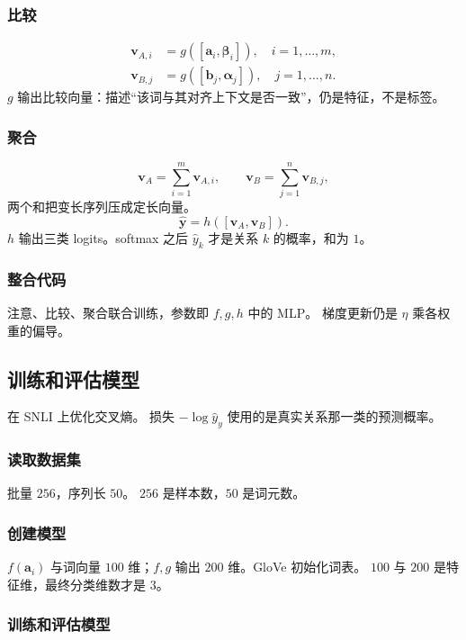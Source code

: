 \subsubsection{比较}

\begin{align*}
\bm{v}_{A,i}&=g([\bm{a}_i,\bm{\beta}_i]),\quad i=1,\ldots,m,
\\
\bm{v}_{B,j}&=g([\bm{b}_j,\bm{\alpha}_j]),\quad j=1,\ldots,n.
\end{align*}
$g$ 输出比较向量：描述“该词与其对齐上下文是否一致”，仍是特征，不是标签。

\subsubsection{聚合}

\[
\bm{v}_A=\sum_{i=1}^{m}\bm{v}_{A,i},\qquad
\bm{v}_B=\sum_{j=1}^{n}\bm{v}_{B,j},
\]
两个和把变长序列压成定长向量。
\[
\hat{\bm{y}}=h([\bm{v}_A,\bm{v}_B]).
\]
$h$ 输出三类 logits。softmax 之后 $\hat y_k$ 才是关系 $k$ 的概率，和为 $1$。

\subsubsection{整合代码}

注意、比较、聚合联合训练，参数即 $f,g,h$ 中的 MLP。
梯度更新仍是 $\eta$ 乘各权重的偏导。

\subsection{训练和评估模型}

在 SNLI 上优化交叉熵。
损失 $-\log\hat y_y$ 使用的是真实关系那一类的预测概率。

\subsubsection{读取数据集}

批量 $256$，序列长 $50$。
$256$ 是样本数，$50$ 是词元数。

\subsubsection{创建模型}

$f(\bm{a}_i)$ 与词向量 $100$ 维；$f,g$ 输出 $200$ 维。GloVe 初始化词表。
$100$ 与 $200$ 是特征维，最终分类维数才是 $3$。

\subsubsection{训练和评估模型}


